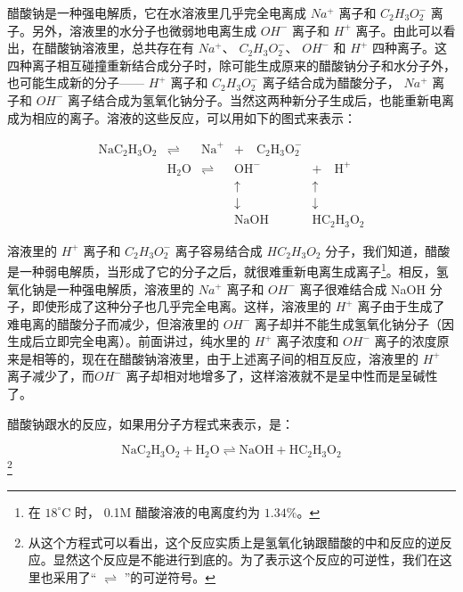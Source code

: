 醋酸钠是一种强电解质，它在水溶液里几乎完全电离成 \(Na^{+}\) 离子和
\(C_{2}H_{3}O_{2}^{-}\) 离子。另外，溶液里的水分子也微弱地电离生成
\(OH^{-}\) 离子和 \(H^{+}\)
离子。由此可以看出，在醋酸钠溶液里，总共存在有 \(Na^{+}\)、
\(C_{2}H_{3}O_{2}^{-}\)、 \(OH^{-}\) 和 \(H^{+}\)
四种离子。这四种离子相互碰撞重新结合成分子时，除可能生成原来的醋酸钠分子和水分子外，也可能生成新的分子------
\(H^{+}\) 离子和 \(C_{2}H_{3}O_{2}^{-}\) 离子结合成为醋酸分子，
\(Na^{+}\) 离子和 \(OH^{-}\)
离子结合成为氢氧化钠分子。当然这两种新分子生成后，也能重新电离成为相应的离子。溶液的这些反应，可以用如下的图式来表示：

\[
\begin{array}{ccccc} \mathrm{NaC}_{2}\mathrm{H}_{3}\mathrm{O}_{2} & \rightleftharpoons & \mathrm{Na}^{+} & + \quad \mathrm{C}_{2}\mathrm{H}_{3}\mathrm{O}_{2}^{-} \\ & \mathrm{H}_{2}\mathrm{O} & \rightleftharpoons & \mathrm{OH}^{-} & + \quad \mathrm{H}^{+} \\ & & & \uparrow & \uparrow \\ & & & \downarrow & \downarrow \\ & & & \mathrm{NaOH} & \mathrm{HC}_{2}\mathrm{H}_{3}\mathrm{O}_{2} \end{array}
\]

溶液里的 \(H^{+}\) 离子和 \(C_{2}H_{3}O_{2}^{-}\) 离子容易结合成
\(HC_{2}H_{3}O_{2}\)
分子，我们知道，醋酸是一种弱电解质，当形成了它的分子之后，就很难重新电离生成离子\footnote{在
  \(18^{\circ} \mathrm{C}\) 时， 0.1M 醋酸溶液的电离度约为 \(1.34\%\)。}。相反，氢氧化钠是一种强电解质，溶液里的
\(Na^{+}\) 离子和 \(OH^{-}\) 离子很难结合成 NaOH
分子，即使形成了这种分子也几乎完全电离。这样，溶液里的 \(H^{+}\)
离子由于生成了难电离的醋酸分子而减少，但溶液里的 \(OH^{-}\)
离子却并不能生成氢氧化钠分子（因生成后立即完全电离）。前面讲过，纯水里的
\(H^{+}\) 离子浓度和 \(OH^{-}\)
离子的浓度原来是相等的，现在在醋酸钠溶液里，由于上述离子间的相互反应，溶液里的
\(H^{+}\) 离子减少了，而\(OH^{-}\)
离子却相对地增多了，这样溶液就不是呈中性而是呈碱性了。

醋酸钠跟水的反应，如果用分子方程式来表示，是：

\[
\mathrm{NaC} _ {2} \mathrm{H} _ {3} \mathrm{O} _ {2} + \mathrm{H} _ {2} \mathrm{O} \rightleftharpoons \mathrm{NaOH} + \mathrm{HC} _ {2} \mathrm{H} _ {3} \mathrm{O} _ {2}
\] \footnote{从这个方程式可以看出，这个反应实质上是氢氧化钠跟醋酸的中和反应的逆反应。显然这个反应是不能进行到底的。为了表示这个反应的可逆性，我们在这里也采用了``
  \(\rightleftharpoons\) ''的可逆符号。}

